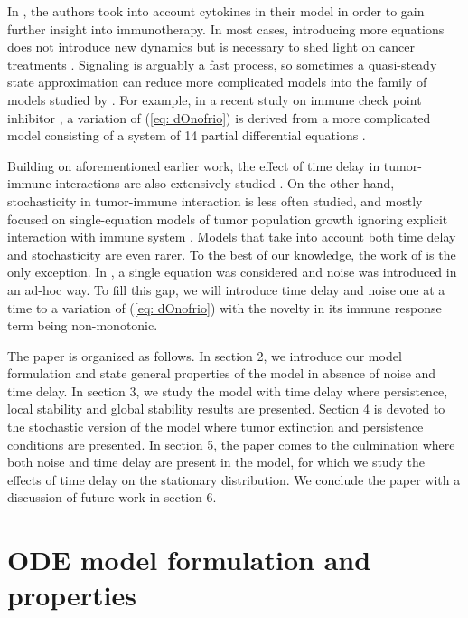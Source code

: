 \documentclass{aims}
\theoremstyle{definition}
\begin{document}
In \cite{Kirschner1998}, the authors took into account cytokines
in their model in order to gain further insight into immunotherapy.
In most cases, introducing more equations does not introduce new dynamics
but is necessary to shed light on cancer treatments \cite{Eftimie2011}.
Signaling is arguably a fast process, so sometimes a quasi-steady
state approximation can reduce more complicated models into the family
of models studied by \cite{dOnofrio2008}. For example, in a recent
study on immune check point inhibitor \cite{Nikolopoulou2018}, a
variation of (\ref{eq: dOnofrio}) is derived from a more complicated
model consisting of a system of 14 partial differential equations
\cite{Lai2017}. 

Building on aforementioned earlier work, the effect of time delay
in tumor-immune interactions are also extensively studied \cite{Banerjee2008,dOnofrio2010,galach2003dynamics,Rihan2014}.
On the other hand, stochasticity in tumor-immune interaction is less
often studied, and mostly focused on single-equation models of tumor
population growth ignoring explicit interaction with immune system
\cite{Lefever1979,Bose2009,Li2017}. Models that take into account
both time delay and stochasticity are even rarer. To the best of our
knowledge, the work of \cite{Guo2014} is the only exception. In \cite{Guo2014},
a single equation was considered and noise was introduced in an ad-hoc
way. To fill this gap, we will introduce time delay and noise one
at a time to a variation of (\ref{eq: dOnofrio}) with the novelty
in its immune response term being non-monotonic. 

The paper is organized as follows. In section 2, we introduce our
model formulation and state general properties of the model in absence
of noise and time delay. In section 3, we study the model with time
delay where persistence, local stability and global stability results
are presented. Section 4 is devoted to the stochastic version of the
model where tumor extinction and persistence conditions are presented.
In section 5, the paper comes to the culmination where both noise
and time delay are present in the model, for which we study the effects
of time delay on the stationary distribution. We conclude the paper
with a discussion of future work in section 6. 

\section{ODE model formulation and properties }
\end{document}
